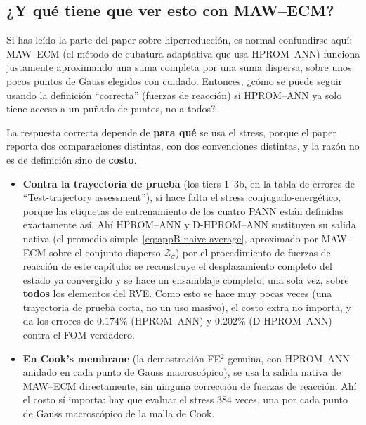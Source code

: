 \documentclass[11pt,a4paper]{article}
\begin{document}
\subsection{¿Y qu\'e tiene que ver esto con MAW--ECM?}

Si has le\'ido la parte del paper sobre hiperreducci\'on, es normal
confundirse aqu\'i: MAW--ECM (el m\'etodo de cubatura adaptativa que
usa HPROM--ANN) funciona justamente aproximando una suma completa por
una suma dispersa, sobre unos pocos puntos de Gauss elegidos con
cuidado. Entonces, ¿c\'omo se puede seguir usando la definici\'on
``correcta'' (fuerzas de reacci\'on) si HPROM--ANN ya solo tiene acceso
a un pu\~nado de puntos, no a todos?

La respuesta correcta depende de \textbf{para qu\'e} se usa el stress,
porque el paper reporta dos comparaciones distintas, con dos
convenciones distintas, y la raz\'on no es de definici\'on sino de
\textbf{costo}.

\begin{itemize}
\item \textbf{Contra la trayectoria de prueba} (los tiers 1--3b, en la
tabla de errores de ``Test-trajectory assessment''), s\'i hace falta
el stress conjugado-energ\'etico, porque las etiquetas de
entrenamiento de los cuatro PANN est\'an definidas exactamente as\'i.
Ah\'i HPROM--ANN y D-HPROM--ANN sustituyen su salida nativa (el
promedio simple~\eqref{eq:appB-naive-average}, aproximado por
MAW--ECM sobre el conjunto disperso $\mathcal Z_\sigma$) por el
procedimiento de fuerzas de reacci\'on de este cap\'itulo: se
reconstruye el desplazamiento completo del estado ya convergido y se
hace un ensamblaje completo, una sola vez, sobre \textbf{todos} los
elementos del RVE. Como esto se hace muy pocas veces (una trayectoria
de prueba corta, no un uso masivo), el costo extra no importa, y da
los errores de $0.174\%$ (HPROM--ANN) y $0.202\%$ (D-HPROM--ANN)
contra el FOM verdadero.
\item \textbf{En Cook's membrane} (la demostraci\'on FE$^2$ genuina,
con HPROM--ANN anidado en cada punto de Gauss macrosc\'opico), se usa
la salida nativa de MAW--ECM directamente, sin ninguna correcci\'on de
fuerzas de reacci\'on. Ah\'i el costo s\'i importa: hay que evaluar el
stress $384$ veces, una por cada punto de Gauss macrosc\'opico de la
malla de Cook.
\end{itemize}
\end{document}
